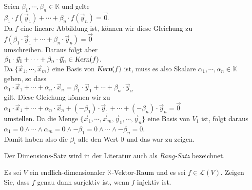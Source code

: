 \begin{enumerate}
      Seien $\beta_1, \cdots, \beta_n \in \mathbb{K}$ und gelte
      \\[0.2cm]
      \hspace*{1.3cm}
      $\beta_1 \cdot f(\vec{y}_1) + \cdots + \beta_n \cdot f(\vec{y}_n) = \vec{0}$.
      \\[0.2cm]
      Da $f$ eine lineare Abbildung ist, k\"{o}nnen wir diese Gleichung zu
      \\[0.2cm]
      \hspace*{1.3cm}
      $f(\beta_1 \cdot \vec{y}_1 + \cdots + \beta_n \cdot \vec{y}_n) = \vec{0}$
      \\[0.2cm]
      umschreiben.  Daraus folgt aber
      \\[0.2cm]
      \hspace*{1.3cm}
      $\beta_1 \cdot \vec{y}_1 + \cdots + \beta_n \cdot \vec{y}_n \in \textsl{Kern}(f)$.
      \\[0.2cm]
      Da $\{ \vec{x}_1, \cdots, \vec{x}_m \}$ eine Basis von $\textsl{Kern}(f)$ ist, muss es also
      Skalare $\alpha_1, \cdots, \alpha_n \in \mathbb{K}$ geben, so dass
      \\[0.2cm]
      \hspace*{1.3cm}
      $\alpha_1 \cdot \vec{x}_1 + \cdots + \alpha_n \cdot \vec{x}_n = \beta_1 \cdot \vec{y}_1 + \cdots + \beta_n \cdot \vec{y}_n$
      \\[0.2cm]
      gilt.  Diese Gleichung k\"{o}nnen wir zu
      \\[0.2cm]
      \hspace*{1.3cm}
      $\alpha_1 \cdot \vec{x}_1 + \cdots + \alpha_n \cdot \vec{x}_n + (-\beta_1) \cdot \vec{y}_1 + \cdots + (-\beta_n) \cdot \vec{y}_n = \vec{0}$
      \\[0.2cm]
      umstellen.  Da die Menge $\{ \vec{x}_1, \cdots, \vec{x}_m,  \vec{y}_1, \cdots, \vec{y}_n \}$ eine Basis von $V_1$ ist,
      folgt daraus
      \\[0.2cm]
      \hspace*{1.3cm}
      $\alpha_1 = 0 \wedge \cdots \wedge \alpha_m = 0 \wedge -\beta_1 = 0 \wedge \cdots \wedge -\beta_n = 0$.
      \\[0.2cm]
      Damit haben also die $\beta_i$ alle den Wert $0$ und das war zu zeigen. \qeds
\end{enumerate}
\remark
Der Dimensions-Satz wird in der Literatur auch als \emph{Rang-Satz} bezeichnet.
\eoxs

\exercise
Es sei $V$ ein endlich-dimensionaler $\mathbb{K}$-Vektor-Raum und es sei $f \in \mathcal{L}(V)$.
Zeigen Sie, dass $f$ genau dann surjektiv ist, wenn $f$ injektiv ist. \exend


